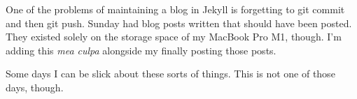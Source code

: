 One of the problems of maintaining a blog in Jekyll is forgetting to git
commit and then git push. Sunday had blog posts written that should have
been posted. They existed solely on the storage space of my MacBook Pro
M1, though. I'm adding this \emph{mea culpa} alongside my finally
posting those posts.

Some days I can be slick about these sorts of things. This is not one of
those days, though.
